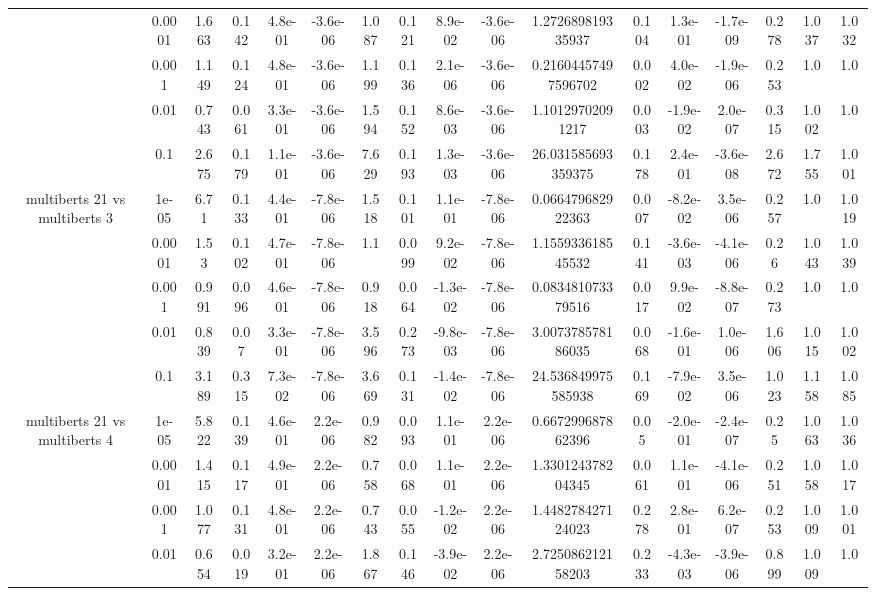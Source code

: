 \begin{tabular}{|c|c|c|c|c|c|c|c|c|c|c|c|c|c|c|c|c|}
 & 0.0001 & 1.663 & 0.142 & 4.8e-01 & -3.6e-06 & 1.087 & 0.121 & 8.9e-02 & -3.6e-06 & 1.272689819335937 & 0.104 & 1.3e-01 & -1.7e-09 & 0.278 & 1.037 & 1.032 \\
 & 0.001 & 1.149 & 0.124 & 4.8e-01 & -3.6e-06 & 1.199 & 0.136 & 2.1e-06 & -3.6e-06 & 0.21604457497596702 & 0.002 & 4.0e-02 & -1.9e-06 & 0.253 & 1.0 & 1.0 \\
 & 0.01 & 0.743 & 0.061 & 3.3e-01 & -3.6e-06 & 1.594 & 0.152 & 8.6e-03 & -3.6e-06 & 1.10129702091217 & 0.003 & -1.9e-02 & 2.0e-07 & 0.315 & 1.002 & 1.0 \\
 & 0.1 & 2.675 & 0.179 & 1.1e-01 & -3.6e-06 & 7.629 & 0.193 & 1.3e-03 & -3.6e-06 & 26.031585693359375 & 0.178 & 2.4e-01 & -3.6e-08 & 2.672 & 1.755 & 1.001 \\
\hline
\multirow{5}{*}{multiberts 21 vs multiberts 3} & 1e-05 & 6.71 & 0.133 & 4.4e-01 & -7.8e-06 & 1.518 & 0.101 & 1.1e-01 & -7.8e-06 & 0.066479682922363 & 0.007 & -8.2e-02 & 3.5e-06 & 0.257 & 1.0 & 1.019 \\
 & 0.0001 & 1.53 & 0.102 & 4.7e-01 & -7.8e-06 & 1.1 & 0.099 & 9.2e-02 & -7.8e-06 & 1.155933618545532 & 0.141 & -3.6e-03 & -4.1e-06 & 0.26 & 1.043 & 1.039 \\
 & 0.001 & 0.991 & 0.096 & 4.6e-01 & -7.8e-06 & 0.918 & 0.064 & -1.3e-02 & -7.8e-06 & 0.083481073379516 & 0.017 & 9.9e-02 & -8.8e-07 & 0.273 & 1.0 & 1.0 \\
 & 0.01 & 0.839 & 0.07 & 3.3e-01 & -7.8e-06 & 3.596 & 0.273 & -9.8e-03 & -7.8e-06 & 3.007378578186035 & 0.068 & -1.6e-01 & 1.0e-06 & 1.606 & 1.015 & 1.002 \\
 & 0.1 & 3.189 & 0.315 & 7.3e-02 & -7.8e-06 & 3.669 & 0.131 & -1.4e-02 & -7.8e-06 & 24.536849975585938 & 0.169 & -7.9e-02 & 3.5e-06 & 1.023 & 1.158 & 1.085 \\
\hline
\multirow{5}{*}{multiberts 21 vs multiberts 4} & 1e-05 & 5.822 & 0.139 & 4.6e-01 & 2.2e-06 & 0.982 & 0.093 & 1.1e-01 & 2.2e-06 & 0.667299687862396 & 0.05 & -2.0e-01 & -2.4e-07 & 0.25 & 1.063 & 1.036 \\
 & 0.0001 & 1.415 & 0.117 & 4.9e-01 & 2.2e-06 & 0.758 & 0.068 & 1.1e-01 & 2.2e-06 & 1.330124378204345 & 0.061 & 1.1e-01 & -4.1e-06 & 0.251 & 1.058 & 1.017 \\
 & 0.001 & 1.077 & 0.131 & 4.8e-01 & 2.2e-06 & 0.743 & 0.055 & -1.2e-02 & 2.2e-06 & 1.448278427124023 & 0.278 & 2.8e-01 & 6.2e-07 & 0.253 & 1.009 & 1.001 \\
 & 0.01 & 0.654 & 0.019 & 3.2e-01 & 2.2e-06 & 1.867 & 0.146 & -3.9e-02 & 2.2e-06 & 2.725086212158203 & 0.233 & -4.3e-03 & -3.9e-06 & 0.899 & 1.009 & 1.0 \\

\end{tabular}
